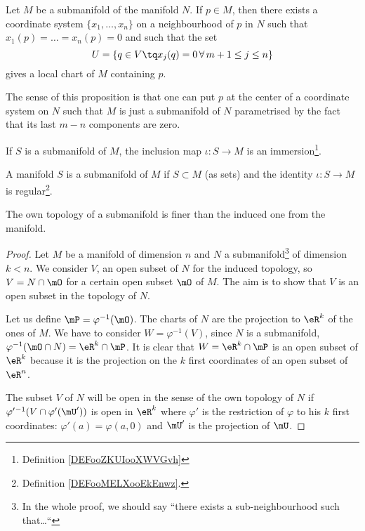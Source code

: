 \begin{proposition}       \label{PROPooLJYEooMjevio}
	Let $M$ be a submanifold of the manifold $N$. If $p\in M$, then there  exists a coordinate system $\{x_1,\ldots,x_n\}$ on a neighbourhood of $p$ in $N$ such that $x_1(p)=\ldots=x_n(p)=0$ and such that the set
	\[
		U=\{q\in V\tq x_j(q)=0\,\forall\, m+1\leq j\leq n\}
	\]
	gives a local chart of $M$ containing $p$.
\end{proposition}

The sense of this proposition is that one can put $p$ at the center of a coordinate system on $N$ such that $M$ is just a submanifold of $N$ parametrised by the fact that its last $m-n$ components are zero.

\begin{proposition}       \label{PROPooEWUCooTStAvb}
	If \( S\) is a submanifold of \( M\), the inclusion map \( \iota\colon S \to M\) is an immersion\footnote{Definition \ref{DEFooZKUIooXWVGvh}}.
\end{proposition}

\begin{proposition}     \label{PROPooZACHooCNgLSl}
	A manifold \( S\) is a submanifold of \( M\) if \( S\subset M\) (as sets) and the identity \( \iota\colon S\to M\) is regular\footnote{Definition \ref{DEFooMELXooEkEnwz}.}.
\end{proposition}

\begin{proposition}\label{prop:topo_sub_manif}
	The own topology of a submanifold is finer than the induced one from the manifold.
\end{proposition}

\begin{proof}
	Let $M$ be a manifold of dimension $n$ and $N$ a submanifold\footnote{In the whole proof, we should say ``there exists a sub-neighbourhood such that\ldots``} of dimension $k<n$. We consider $V$, an open subset of $N$ for the induced topology, so $V=N\cap\mO$ for a certain open subset $\mO$ of $M$. The aim is to show that $V$ is an open subset in the topology of $N$.

	Let us define $\mP=\varphi^{-1}(\mO)$.  The charts of $N$ are the projection to $\eR^k$ of the ones of $M$. We have to consider $W=\varphi^{-1}(V)$, since $N$ is a submanifold, $\varphi^{-1}(\mO\cap N)=\eR^k\cap\mP$. It is clear that $W=\eR^k\cap\mP$ is an open subset of $\eR^k$ because it is the projection on the $k$ first coordinates of an open subset of $\eR^n$.

	The subset $V$ of $N$ will be open in the sense of the own topology of $N$ if $\varphi'{}^{-1}(V\cap\varphi'(\mU'))$ is open in $\eR^k$ where $\varphi'$ is the restriction of $\varphi$ to his $k$ first coordinates: $\varphi'(a)=\varphi(a,0)$ and $\mU'$ is the projection of $\mU$.
\end{proof}


